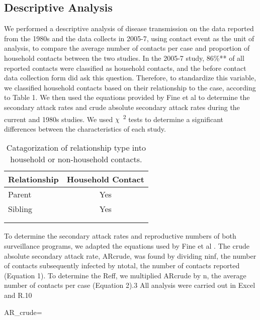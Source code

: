 \subsection{Descriptive Analysis}
We performed a descriptive analysis of disease transmission on the data reported from the 1980s and the data collects in 2005-7, using contact event as the unit of analysis, to compare the average number of contacts per case and proportion of household contacts between the two studies. In the 2005-7 study, 86\%** of all reported contacts were classified as household contacts, and the before contact data collection form did ask this question. Therefore, to standardize this variable, we classified household contacts based on their relationship to the case, according to Table 1. We then used the equations provided by Fine et al \cite{Fine1988} to determine the secondary attack rates and crude absolute secondary attack rates during the current and 1980s studies. We used $\chi$\ \textsuperscript{2} tests to determine a significant differences between the characteristics of each study.

\begin{table} 
\centering
\caption{Catagorization of relationship type into household or non-household contacts.} 
    \begin{tabular}{ l c }
    \toprule
        Relationship & Household Contact \\ 
        \midrule
        Parent & Yes \\ 
        Sibling & Yes \\ 
         &  \\ 
         &  \\ 
         \bottomrule
    \end{tabular} 
\end{table}

To determine the secondary attack rates and reproductive numbers of both surveillance programs, we adapted the equations used by Fine et al \cite{Fine1988}. 
The crude absolute secondary attack rate, ARcrude, was found by dividing ninf, the number of contacts subsequently infected by ntotal, the number of contacts reported (Equation 1). To determine the Reff, we multiplied ARcrude by n, the average number of contacts per case (Equation 2).3  All analysis were carried out in Excel and R.10

\beginequation
AR_{crude}=
\endequation